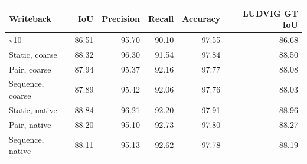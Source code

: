 \begin{tabular}{lrrrrr}
\toprule
Writeback & IoU & Precision & Recall & Accuracy & LUDVIG GT IoU \\\midrule
v10 & 86.51 & 95.70 & 90.10 & 97.55 & 86.68 \\
Static, coarse & 88.32 & 96.30 & 91.54 & 97.84 & 88.50 \\
Pair, coarse & 87.94 & 95.37 & 92.16 & 97.77 & 88.08 \\
Sequence, coarse & 87.89 & 95.42 & 92.06 & 97.76 & 88.03 \\
Static, native & 88.84 & 96.21 & 92.20 & 97.91 & 88.96 \\
Pair, native & 88.20 & 95.10 & 92.73 & 97.80 & 88.27 \\
Sequence, native & 88.11 & 95.13 & 92.62 & 97.78 & 88.19 \\
\bottomrule
\end{tabular}
